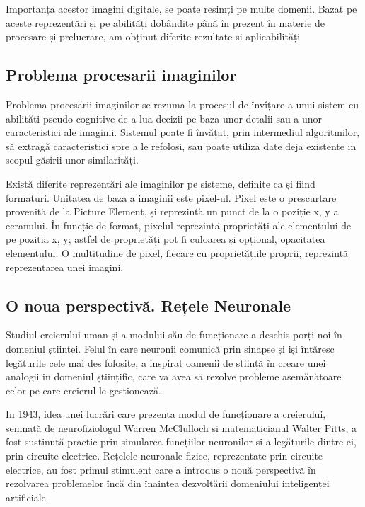 	Importanța acestor imagini digitale, se poate resimți pe multe domenii. Bazat pe aceste reprezentări și pe abilități dobândite până în prezent în materie de procesare și prelucrare, am obținut diferite rezultate si aplicabilități
	
	\subsection{Problema procesarii imaginilor}
	Problema procesării imaginilor se rezuma la procesul de învîțare a unui sistem cu abilităti pseudo-cognitive de a lua decizii pe baza unor detalii sau a unor caracteristici ale imaginii. Sistemul poate fi învățat, prin intermediul algoritmilor, să extragă caracteristici spre a le refolosi, sau poate utiliza date deja existente in scopul găsirii unor similarități. 
	
	Există diferite reprezentări ale imaginilor pe sisteme, definite ca și fiind formaturi. Unitatea de baza a imaginii este pixel-ul. Pixel este o prescurtare provenită de la Picture Element, și reprezintă un punct de la o poziție x, y a ecranului. În funcție de format, pixelul reprezintă proprietăți ale elementului de pe pozitia x, y; astfel de proprietăți pot fi culoarea și opțional, opacitatea elementului. O multitudine de pixel, fiecare cu proprietățiile proprii, reprezintă reprezentarea unei imagini. \cite{image_representation}
	
	\subsection{O noua perspectivă. Rețele Neuronale}
	Studiul creierului uman și a modului său de funcționare a deschis porți noi în domeniul științei. Felul în care neuronii comunică prin sinapse și iși întăresc legăturile cele mai des folosite, a inspirat oamenii de știință în creare unei analogii in domeniul științific, care va avea să rezolve probleme asemănătoare celor pe care creierul le gestionează.
	
	In 1943, idea unei  lucrări care prezenta modul de funcționare a creierului, semnată de  neurofiziologul Warren McClulloch și matematicianul Walter Pitts,   a fost susținută practic prin simularea funcțiilor neuronilor si a legăturile dintre ei, prin circuite electrice. Rețelele neuronale fizice, reprezentate prin circuite electrice, au fost primul stimulent care a introdus o nouă perspectivă în rezolvarea problemelor încă din înaintea dezvoltării domeniului inteligenței artificiale. 
	
